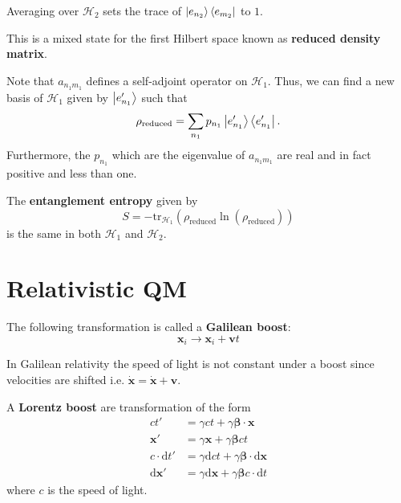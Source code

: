 \documentclass[12pt, a4paper]{article}
\newcommand{\hilbert}{\mathcal H}
\begin{document}
\begin{mdnote}
    Averaging over \(\mathcal{H}_2\) sets the trace of \(\ket{e_{n_2}}\bra{e_{m_2}}\) to \(1\).
\end{mdnote}

This is a mixed state for the first Hilbert space known as \textbf{reduced density matrix}.

\noindent Note that \(a_{n_1 m_1}\) defines a self-adjoint operator on \(\hilbert_1\). Thus, we can find a new basis of \(\hilbert_1\) given by \(\ket{e'_{n_1}}\) such that 
\[\rho_{\text{reduced}} = \sum_{n_1} p_{n_1} \ket{e'_{n_1}} \bra{e'_{n_1}}.\]
Furthermore, the \(p_{n_1}\) which are the eigenvalue of \(a_{n_1 m_1}\) are real and in fact positive and less than one.

\begin{mdthm}
    The \textbf{entanglement entropy} given by 
    \[S = -\text{tr}_{\hilbert_1} \left( \rho_{\text{reduced}} \ln(\rho_{\text{reduced}}) \right)\]
    is the same in both \(\hilbert_1\) and \(\hilbert_2\).
\end{mdthm}

\section{Relativistic QM}

\begin{definition}
    The following transformation is called a \textbf{Galilean boost}:
    \[\bm{x}_i \to \bm{x}_i+\bm{v}t\]
\end{definition}

\begin{mdnote}
    In Galilean relativity the speed of light is not constant under a boost since velocities are shifted i.e. \(\bm{{\dot{x}}}=\bm{{\dot{x}}}+\bm{v}\).
\end{mdnote}

\begin{definition}
    A \textbf{Lorentz boost} are transformation of the form 
    \[\begin{aligned}
        ct' &= \gamma ct + \gamma \bm{\beta} \cdot \bm{x} \\
        \bm{x}' &= \gamma \bm{x} + \gamma \bm{\beta} ct \\
        c \cdot \text{d}t' &= \gamma \text{d}ct + \gamma \bm{\beta} \cdot \text{d}\bm{x} \\
        \text{d}\bm{x}' &= \gamma \text{d}\bm{x} + \gamma \bm{\beta} c \cdot \text{d}t
        \end{aligned}
        \]
    where \(c\) is the speed of light.
\end{definition}
\end{document}
